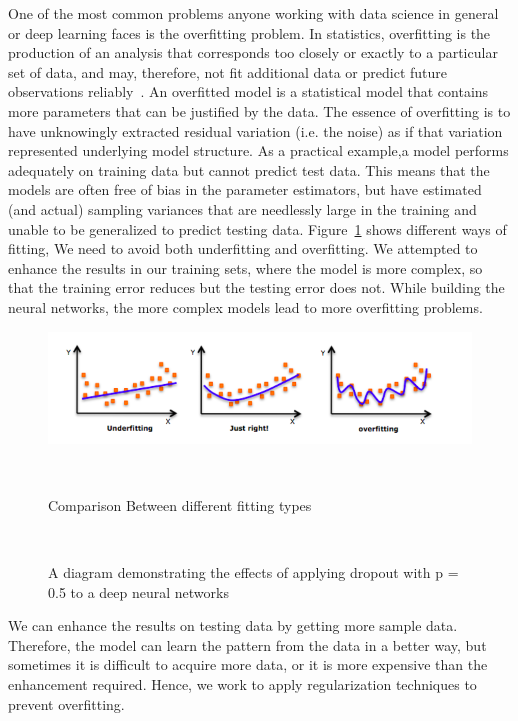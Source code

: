 One of the most common problems anyone working with data science in general or deep learning faces is the overfitting problem. In statistics, overfitting is the production of an analysis that corresponds too closely or exactly to a particular set of data, and may, therefore, not fit additional data or predict future observations reliably~\cite{Wiki_Overfitting}. An overfitted model is a statistical model that contains more parameters that can be justified by the data. The essence of overfitting is to have unknowingly extracted residual variation (i.e. the noise) as if that variation represented underlying model structure. As a practical example,a  model performs adequately on training data but cannot predict test data. This means that the models are often free of bias in the parameter estimators, but have estimated (and actual) sampling variances that are needlessly large in the training and unable to be generalized to predict testing data. Figure~\ref{Fig:Fitting} shows different ways of fitting, We need to avoid both underfitting and overfitting. We attempted to enhance the results in our training sets, where the model is more complex, so that the training error reduces but the testing error does not. While building the neural networks, the more complex models lead to more overfitting problems.%
%
\begin{figure}[!t]
\centering
\includegraphics[scale=0.6]{./Figures/Ch_2_Background/Fig_Fitting.png}
\caption{Comparison Between different fitting types}~\label{Fig:Fitting}
\end{figure}%
%
\begin{figure}[!t]
\centering

\caption{A diagram demonstrating the effects of applying dropout with p = 0.5 to a deep neural networks~\cite{Gitrepo_NN_Tikz}}~\label{Fig:NN_Dropout}
\end{figure}%
%
We can enhance the results on testing data by getting more sample data. Therefore, the model can learn the pattern from the data in a better way, but sometimes it is difficult to acquire more data, or it is more expensive than the enhancement required. Hence, we work to apply regularization techniques to prevent overfitting.

